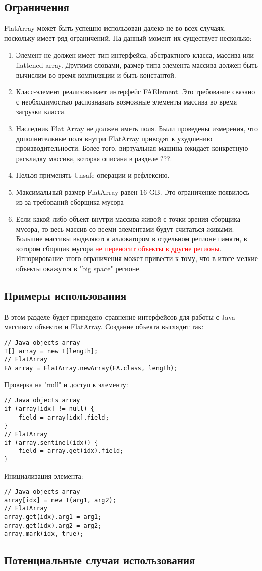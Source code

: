 \subsection{Ограничения}
FlatArray может быть успешно использован далеко не во всех случаях, поскольку имеет ряд ограничений. На данный момент их существует несколько:
\begin{enumerate}
	\item Элемент не должен имеет тип интерфейса, абстрактного класса, массива или flattened array. Другими словами, размер типа элемента массива должен быть вычислим во время компиляции и быть константой.
	\item Класс-элемент реализовывает интерфейс FAElement. Это требование связано с необходимостью распознавать возможные элементы массива во время загрузки класса.
	\item Наследник Flat Array не должен иметь поля. Были проведены измерения, что дополнительные поля внутри FlatArray приводят к ухудшению производительности. Более того, виртуальная машина ожидает конкретную раскладку массива, которая описана в разделе ???.
	\item Нельзя применять Unsafe операции и рефлексию.
	\item Максимальный размер FlatArray равен 16 GB. Это ограничение появилось из-за требований сборщика мусора
	\item Если какой либо объект внутри массива живой с точки зрения сборщика мусора, то весь массив со всеми элементами будут считаться живыми. Большие массивы выделяются аллокатором в отдельном регионе памяти, в котором сборщик мусора \textcolor{red}{ не переносит объекты в другие регионы}. Игнорирование этого ограничения может привести к тому, что в итоге мелкие объекты окажутся в "big space" регионе.
\end{enumerate}

\subsection{Примеры использования}
В этом разделе будет приведено сравнение интерфейсов для работы с Java массивом объектов и FlatArray. Создание объекта выглядит так:
\begin{lstlisting}
// Java objects array
T[] array = new T[length];
// FlatArray
FA array = FlatArray.newArray(FA.class, length);
\end{lstlisting}
Проверка на "null" и доступ к элементу:
\begin{lstlisting}
// Java objects array
if (array[idx] != null) {
	field = array[idx].field;
}
// FlatArray
if (array.sentinel(idx)) {
	field = array.get(idx).field;
}
\end{lstlisting}
Инициализация элемента:
\begin{lstlisting}
// Java objects array
array[idx] = new T(arg1, arg2);
// FlatArray
array.get(idx).arg1 = arg1;
array.get(idx).arg2 = arg2;
array.mark(idx, true);
\end{lstlisting}

\subsection{Потенциальные случаи использования}

\clearpage